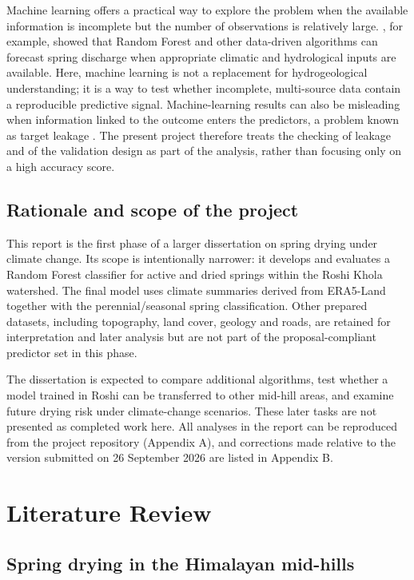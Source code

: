 \documentclass[12pt,a4paper]{article}
\begin{document}
Machine learning offers a practical way to explore the problem when the available information is incomplete but the number of observations is relatively large. \citet{granata2018}, for example, showed that Random Forest and other data-driven algorithms can forecast spring discharge when appropriate climatic and hydrological inputs are available. Here, machine learning is not a replacement for hydrogeological understanding; it is a way to test whether incomplete, multi-source data contain a reproducible predictive signal. Machine-learning results can also be misleading when information linked to the outcome enters the predictors, a problem known as target leakage \citep{kaufman2011,kapoor2023}. The present project therefore treats the checking of leakage and of the validation design as part of the analysis, rather than focusing only on a high accuracy score.

\subsection{Rationale and scope of the project}\label{sec:scope}

This report is the first phase of a larger dissertation on spring drying under climate change. Its scope is intentionally narrower: it develops and evaluates a Random Forest classifier for active and dried springs within the Roshi Khola watershed. The final model uses climate summaries derived from ERA5-Land together with the perennial/seasonal spring classification. Other prepared datasets, including topography, land cover, geology and roads, are retained for interpretation and later analysis but are not part of the proposal-compliant predictor set in this phase.

The dissertation is expected to compare additional algorithms, test whether a model trained in Roshi can be transferred to other mid-hill areas, and examine future drying risk under climate-change scenarios. These later tasks are not presented as completed work here. All analyses in the report can be reproduced from the project repository (Appendix A), and corrections made relative to the version submitted on 26 September 2026 are listed in Appendix B.

\clearpage
\section{Literature Review}\label{sec:lit}

\subsection{Spring drying in the Himalayan mid-hills}\label{sec:lit-drying}
\end{document}
